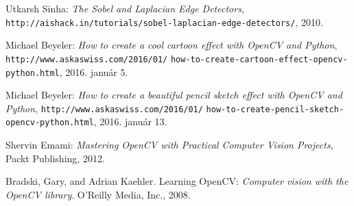 \begin{thebibliography}{x}
Utkarsh Sinha: \emph{The Sobel and Laplacian Edge Detectors}, \texttt{http://aishack.in/tutorials/sobel-laplacian-edge-detectors/}, 2010.

 Michael Beyeler: \emph{How to create a cool cartoon effect with OpenCV and Python}, \texttt{http://www.askaswiss.com/2016/01/} \texttt{how-to-create-cartoon-effect-opencv-python.html}, 2016. január 5.

 Michael Beyeler: \emph{How to create a beautiful pencil sketch effect with OpenCV and Python}, \texttt{http://www.askaswiss.com/2016/01/} \texttt{how-to-create-pencil-sketch-opencv-python.html}, 2016. január 13.

 Shervin Emami: \emph{Mastering OpenCV with Practical Computer Vision Projects}, Packt Publishing, 2012.

Bradski, Gary, and Adrian Kaehler. Learning OpenCV: \emph{Computer vision with the OpenCV library}. O'Reilly Media, Inc., 2008.


\end{thebibliography}